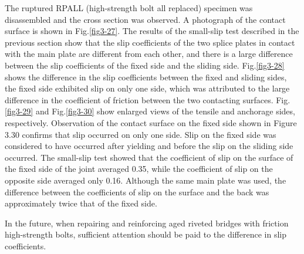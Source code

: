 The ruptured RPALL (high-strength bolt all replaced) specimen was disassembled and the cross section was observed. A photograph of the contact surface is shown in Fig.\ref{fig3-27}. The results of the small-slip test described in the previous section show that the slip coefficients of the two splice plates in contact with the main plate are different from each other, and there is a large difference between the slip coefficients of the fixed side and the sliding side. Fig.\ref{fig3-28} shows the difference in the slip coefficients between the fixed and sliding sides, the fixed side exhibited slip on only one side, which was attributed to the large difference in the coefficient of friction between the two contacting surfaces. Fig.\ref{fig3-29} and Fig.\ref{fig3-30} show enlarged views of the tensile and anchorage sides, respectively. Observation of the contact surface on the fixed side shown in Figure 3.30 confirms that slip occurred on only one side. Slip on the fixed side was considered to have occurred after yielding and before the slip on the sliding side occurred. The small-slip test showed that the coefficient of slip on the surface of the fixed side of the joint averaged 0.35, while the coefficient of slip on the opposite side averaged only 0.16. Although the same main plate was used, the difference between the coefficients of slip on the surface and the back was approximately twice that of the fixed side.

In the future, when repairing and reinforcing aged riveted bridges with friction high-strength bolts, sufficient attention should be paid to the difference in slip coefficients.

